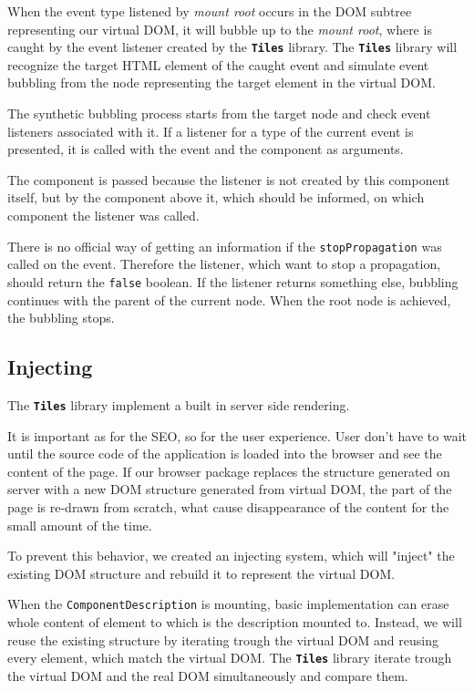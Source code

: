 \documentclass[oneside, 12pt]{book}
\newcommand{\tiles}[0]{\textbf{\texttt{Tiles}} }
\begin{document}
      When the event type listened by \textit{mount root} occurs in the DOM subtree representing our virtual DOM, 
      it will bubble up to the \textit{mount root}, where is caught by the event listener created by the \tiles library. 
      The \tiles library will recognize the target HTML element of the caught event 
      and simulate event bubbling from the node representing the target element in the virtual DOM.

      The synthetic bubbling process starts from the target node and check event listeners associated with it.
      If a listener for a type of the current event is presented, it is called with the event and the component as arguments. 

      The component is passed because the listener is not created by this component itself, 
      but by the component above it, which should be informed, on which component the listener was called.

      There is no official way of getting an information if the \texttt{stopPropagation} was called on the event.
      Therefore the listener, which want to stop a propagation, should return the \texttt{false} boolean.
      If the listener returns something else, bubbling continues with the parent of the current node.
      When the root node is achieved, the bubbling stops.

  \subsection{Injecting}\label{subsec:our-architecture-injecting}

    The \tiles library implement a built in server side rendering.

    It is important as for the SEO, so for the user experience. 
    User don't have to wait until the source code of the application is loaded into the browser and see the content of the page. 
    If our browser package replaces the structure generated on server with a new DOM structure 
    generated from virtual DOM, the part of the page is re-drawn from scratch,
    what cause disappearance of the content for the small amount of the time.

    To prevent this behavior, we created an injecting system, which will "inject" the existing DOM structure 
    and rebuild it to represent the virtual DOM.

    When the \texttt{ComponentDescription} is mounting, 
    basic implementation can erase whole content of element to which is the description mounted to.
    Instead, we will reuse the existing structure by iterating trough the virtual DOM and reusing every element, which match the virtual DOM. 
    The \tiles library iterate trough the virtual DOM and the real DOM simultaneously and compare them. 
\end{document}
